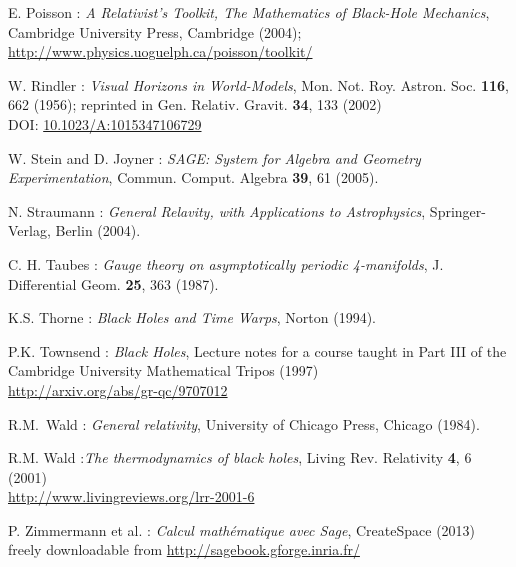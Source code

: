 \begin{thebibliography}{123}
E. Poisson : \emph{A Relativist's Toolkit,
The Mathematics of Black-Hole Mechanics},
Cambridge University Press, Cambridge (2004); \\
\url{http://www.physics.uoguelph.ca/poisson/toolkit/}

W. Rindler : {\em Visual Horizons in World-Models},
Mon. Not. Roy. Astron. Soc. {\bf 116}, 662 (1956);
reprinted in Gen. Relativ. Gravit. {\bf 34}, 133 (2002)\\
DOI: \href{http://dx.doi.org/doi:10.1023/A:1015347106729}{10.1023/A:1015347106729}

W. Stein and D. Joyner : {\em SAGE: System for Algebra and Geometry Experimentation},
Commun. Comput. Algebra {\bf 39}, 61 (2005).

N. Straumann : \emph{General Relavity, with Applications to Astrophysics},
Springer-Verlag, Berlin (2004).

C. H. Taubes : {\em Gauge theory on asymptotically periodic 4-manifolds},
J. Differential Geom. {\bf 25}, 363 (1987).

K.S. Thorne : {\em Black Holes and Time Warps}, Norton (1994).

P.K. Townsend : {\em Black Holes}, Lecture notes for a course taught in Part III
of the Cambridge University Mathematical Tripos (1997) \\
\url{http://arxiv.org/abs/gr-qc/9707012}

R.M.~Wald : {\em General relativity},
University of Chicago Press, Chicago (1984).

R.M. Wald :{\em The thermodynamics of black holes},
Living Rev. Relativity {\bf 4}, 6 (2001) \\
\url{http://www.livingreviews.org/lrr-2001-6}

P. Zimmermann et al. : {\em Calcul math\'ematique avec Sage}, CreateSpace (2013) \\
freely downloadable from \url{http://sagebook.gforge.inria.fr/}

\end{thebibliography}
